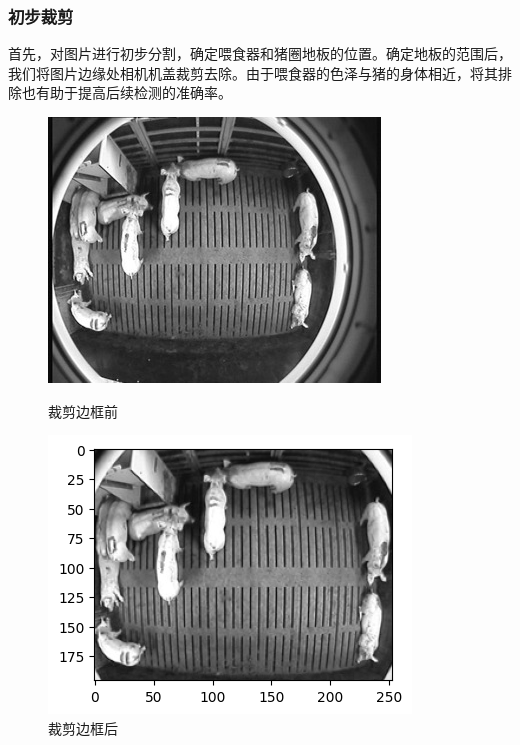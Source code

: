 \subsubsection{初步裁剪}
首先，对图片进行初步分割，确定喂食器和猪圈地板的位置。确定地板的范围后，我们将图片边缘处相机机盖裁剪去除。由于喂食器的色泽与猪的身体相近，将其排除也有助于提高后续检测的准确率。
\begin{figure}[htbp]
    \centering
    \begin{minipage}{0.49\linewidth}
        \includegraphics[width=0.9\linewidth]{pic/before_cut.jpg}
        \caption{裁剪边框前}
        \label{fig-before_cut}
    \end{minipage}
    \begin{minipage}{0.49\linewidth}
        \includegraphics[width=0.9\linewidth]{pic/after_cut.png}
        \caption{裁剪边框后}
    \end{minipage}
    \label{fig-cut}
\end{figure}


